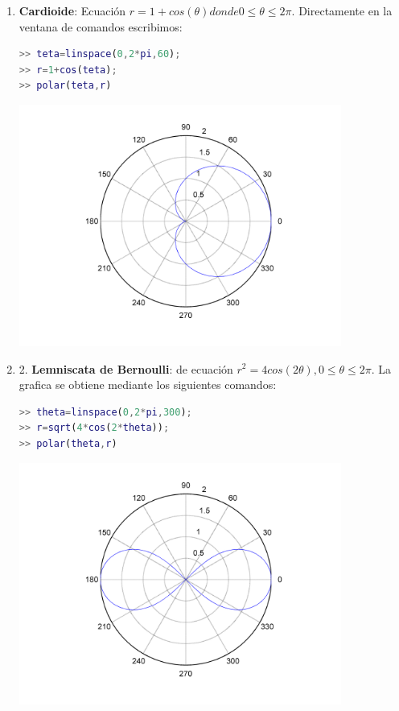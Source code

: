 \begin{enumerate}

\item \textbf{Cardioide}: Ecuación $ r = 1+cos(\theta) donde 0 \leqslant \theta \leqslant 2\pi$. Directamente en la ventana de comandos escribimos:

\begin{lstlisting}[language=Matlab]
>> teta=linspace(0,2*pi,60);
>> r=1+cos(teta);
>> polar(teta,r)
\end{lstlisting}
\begin{center}
\includegraphics[width=300pt]{./Imagenes/polar1.png}
\end{center} 
 

\item 2. \textbf{Lemniscata de Bernoulli}: de ecuación $r^{2} = 4cos(2\theta), 0 \leqslant \theta \leq 2\pi$. 
La grafica se obtiene mediante los siguientes comandos:

\begin{lstlisting}[language=Matlab]
>> theta=linspace(0,2*pi,300); 
>> r=sqrt(4*cos(2*theta)); 
>> polar(theta,r)
\end{lstlisting}
\begin{center}
\includegraphics[width=300pt]{./Imagenes/polar2.png}
\end{center} 

\end{enumerate}